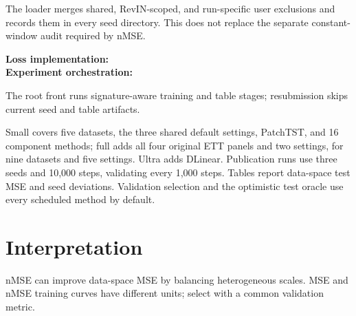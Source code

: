 \documentclass[10pt]{article}
\begin{document}
The loader merges shared, RevIN-scoped, and run-specific user exclusions and
records them in every seed directory. This does not replace the separate
constant-window audit required by nMSE.

\textbf{Loss implementation:} \\
\textbf{Experiment orchestration:} 

The root  front runs signature-aware training and table
stages; resubmission skips current seed and table artifacts.

Small covers five datasets, the three shared default settings, PatchTST, and 16
component methods; full adds all four original ETT panels and two settings,
for nine datasets and five settings. Ultra adds DLinear. Publication runs
use three seeds and 10,000 steps, validating every 1,000 steps. Tables report
data-space test MSE and seed deviations. Validation selection and the optimistic
test oracle use every scheduled method by default.

\section{Interpretation}
nMSE can improve data-space MSE by balancing heterogeneous scales. MSE and nMSE
training curves have different units; select with a common validation metric.
\end{document}
